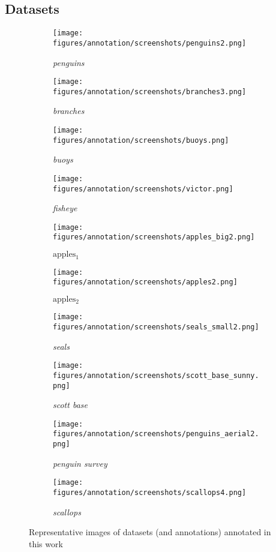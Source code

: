 \documentclass[conference]{IEEEtran}
\begin{document}
\subsection{Datasets}
\begin{figure*}[htbp]
\centering
\begin{subfigure}[t]{0.2\linewidth}
  \texttt{[image: figures/annotation/screenshots/penguins2.png]}
   \caption{\emph{penguins}}
\end{subfigure}%
\begin{subfigure}[t]{0.2\linewidth}
  \texttt{[image: figures/annotation/screenshots/branches3.png]}
   \caption{\emph{branches}}
\end{subfigure}%
\begin{subfigure}[t]{0.2\linewidth}
  \texttt{[image: figures/annotation/screenshots/buoys.png]}
   \caption{\emph{buoys}}
 \end{subfigure}%
\begin{subfigure}[t]{0.2\linewidth}
  \texttt{[image: figures/annotation/screenshots/victor.png]}
  \caption{\emph{fisheye}}
\end{subfigure}%
\begin{subfigure}[t]{0.2\linewidth}
  \texttt{[image: figures/annotation/screenshots/apples\_big2.png]}
  \caption{$\mathrm{apples_1}$}
\end{subfigure}
\begin{subfigure}[t]{0.2\linewidth}
  \texttt{[image: figures/annotation/screenshots/apples2.png]}
  \caption{$\mathrm{apples_2}$}
\end{subfigure}%
 \begin{subfigure}[t]{0.2\linewidth}
  \texttt{[image: figures/annotation/screenshots/seals\_small2.png]}
  \caption{\emph{seals}}
\end{subfigure}%
\begin{subfigure}[t]{0.2\linewidth}
  \texttt{[image: figures/annotation/screenshots/scott\_base\_sunny.png]}
  \caption{\emph{scott base}}
\end{subfigure}%
\begin{subfigure}[t]{0.2\linewidth}
  \texttt{[image: figures/annotation/screenshots/penguins\_aerial2.png]}
  \caption{\emph{penguin survey}}
\end{subfigure}%
\begin{subfigure}[t]{0.2\linewidth}
  \texttt{[image: figures/annotation/screenshots/scallops4.png]}
  \caption{\emph{scallops}}
\end{subfigure}
\caption{Representative images of datasets (and annotations) annotated in this work}
\label{fig:datasets_all}
\end{figure*}
\end{document}
